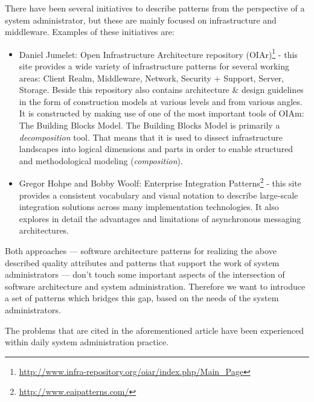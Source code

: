 There have been several initiatives to describe patterns from the perspective of a system administrator, but these are mainly focused on infrastructure and middleware. Examples of these initiatives are: 
\begin{itemize}
	\item Daniel Jumelet: Open Infrastructure Architecture repository (OIAr)\footnote{\url{http://www.infra-repository.org/oiar/index.php/Main_Page}} - this site provides a wide variety of infrastructure patterns for several working areas: Client Realm, Middleware, Network, Security + Support, Server, Storage. Beside this repository also contains architecture \& design guidelines in the form of construction models at various levels and from various angles. It is constructed by making use of one of the most important tools of OIAm: The Building Blocks Model. The Building Blocks Model is primarily a \textit{decomposition} tool. That means that it is used to dissect infrastructure landscapes into logical dimensions and parts in order to enable structured and methodological modeling (\textit{composition}). 
	\item Gregor Hohpe and Bobby Woolf: Enterprise Integration Patterns\footnote{\url{http://www.eaipatterns.com/}} - this site provides a consistent vocabulary and visual notation to describe large-scale integration solutions across many implementation technologies. It also explores in detail the advantages and limitations of asynchronous messaging architectures. 
\end{itemize}

Both approaches --- software architecture patterns for realizing the above described quality attributes and patterns that support the work of system administrators --- don't touch some important aspects of the intersection of software architecture and system administration. Therefore we want to introduce a set of patterns which bridges this gap, based on the needs of the system administrators. 

The problems that are cited in the aforementioned article have been experienced within daily system administration practice. 


